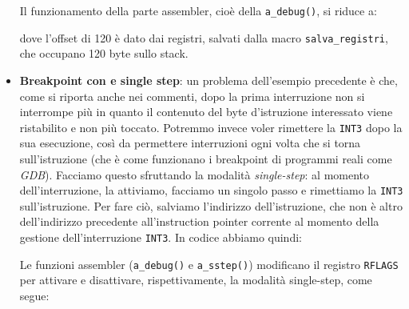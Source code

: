 \documentclass[a4paper,11pt]{article}
\begin{document}
\begin{itemize}
Il funzionamento della parte assembler, cioè della \lstinline|a_debug()|, si riduce a:

dove l'offset di 120 è dato dai registri, salvati dalla macro \lstinline|salva_registri|, che occupano 120 byte sullo stack.

	\item \textbf{Breakpoint con  e single step}: un problema dell'esempio precedente è che, come si riporta anche nei commenti, dopo la prima interruzione non si interrompe più in quanto il contenuto del byte d'istruzione interessato viene ristabilito e non più toccato.
Potremmo invece voler rimettere la \lstinline|INT3| dopo la sua esecuzione, così da permettere interruzioni ogni volta che si torna sull'istruzione (che è come funzionano i breakpoint di programmi reali come \textit{GDB}).
Facciamo questo sfruttando la modalità \textit{single-step}: al momento dell'interruzione, la attiviamo, facciamo un singolo passo e rimettiamo la \lstinline|INT3| sull'istruzione.
Per fare ciò, salviamo l'indirizzo dell'istruzione, che non è altro dell'indirizzo precedente all'instruction pointer corrente al momento della gestione dell'interruzione \lstinline|INT3|.
In codice abbiamo quindi:
\lstset{style=codestyle, language=c++}

Le funzioni assembler (\lstinline|a_debug()| e \lstinline|a_sstep()|) modificano il registro \lstinline|RFLAGS| per attivare e disattivare, rispettivamente, la modalità single-step, come segue: 
\lstset{style=codestyle, language=assembler}


\end{itemize}
\end{document}
